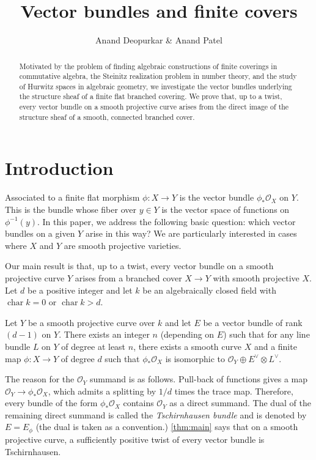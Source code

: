 \documentclass[11 pt]{amsart}
\title{Vector bundles and finite covers}
\author{Anand Deopurkar \& Anand Patel}
\renewcommand{\k}{k}
\renewcommand{\O}{{\mathcal O}}
\newcommand{\charac}{\operatorname{char}}
\providecommand {\from}{{\colon}}
\numberwithin{equation}{section}
\begin{document}
\begin{abstract} 
  Motivated by the problem of finding algebraic constructions of finite coverings in commutative algebra, the Steinitz realization problem in number theory, and the study of Hurwitz spaces in algebraic geometry, we investigate the vector bundles underlying the structure sheaf of a finite flat branched covering.
  We prove that, up to a twist, every vector bundle on a smooth projective curve arises from the direct image of the structure sheaf of a smooth, connected branched cover. 
\end{abstract}
\maketitle

\section{Introduction}

Associated to a finite flat morphism $\phi \from X \to Y$ is the vector bundle $\phi_* \O_X$ on $Y$.
This is the bundle whose fiber over $y \in Y$ is the vector space of functions on $\phi^{-1}(y)$.
In this paper, we address the following basic question: which vector bundles on a given $Y$ arise in this way?
We are particularly interested in cases where $X$ and $Y$ are smooth projective varieties.

Our main result is that, up to a twist, every vector bundle on a smooth projective curve $Y$ arises from a branched cover $X \to Y$ with smooth projective $X$.
Let $d$ be a positive integer and let $\k$ be an algebraically closed field with $\charac \k = 0$ or $\charac \k > d$.
\begin{theorem}[Main]
  \label{thm:main}
  Let $Y$ be a smooth  projective curve over $k$ and let $E$ be a vector bundle of rank $(d-1)$ on $Y$.
  There exists an integer $n$ (depending on $E$) such that for any line bundle $L$ on $Y$ of degree at least $n$, there exists a smooth curve $X$ and a finite map $\phi \from X \to Y$ of degree $d$ such that $\phi_* \O_X$ is isomorphic to $\O_Y \oplus E^{\vee} \otimes L^{\vee}$.
\end{theorem}

The reason for the $\O_Y$ summand is as follows.
Pull-back of functions gives a map $\O_Y \to \phi_* \O_X$, which admits a splitting by $1/d$ times the trace map.
Therefore, every bundle of the form $\phi_* \O_X$ contains $\O_Y$ as a direct summand.
The dual of the remaining direct summand is called the \emph{Tschirnhausen bundle} and is denoted by $E = E_\phi$ (the dual is taken as a convention.)
\autoref{thm:main} says that on a smooth projective curve, a sufficiently positive twist of every vector bundle is Tschirnhausen.
\end{document}
